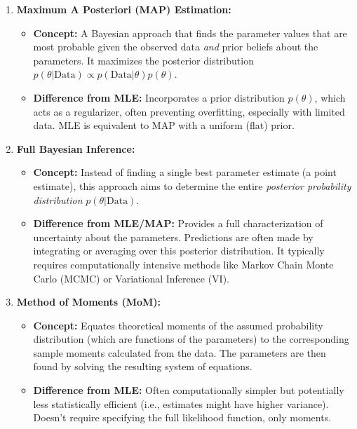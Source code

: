 \documentclass{article}
\begin{document}
\begin{enumerate}

    \item \textbf{Maximum A Posteriori (MAP) Estimation:}
        \begin{itemize}[label=\textbullet, leftmargin=*]
            \item \textbf{Concept:} A Bayesian approach that finds the parameter values that are most probable given the observed data \emph{and} prior beliefs about the parameters. It maximizes the posterior distribution $p(\theta | \text{Data}) \propto p(\text{Data} | \theta) p(\theta)$.
            \item \textbf{Difference from MLE:} Incorporates a prior distribution $p(\theta)$, which acts as a regularizer, often preventing overfitting, especially with limited data. MLE is equivalent to MAP with a uniform (flat) prior.
        \end{itemize}

    \item \textbf{Full Bayesian Inference:}
        \begin{itemize}[label=\textbullet, leftmargin=*]
            \item \textbf{Concept:} Instead of finding a single best parameter estimate (a point estimate), this approach aims to determine the entire \emph{posterior probability distribution} $p(\theta | \text{Data})$.
            \item \textbf{Difference from MLE/MAP:} Provides a full characterization of uncertainty about the parameters. Predictions are often made by integrating or averaging over this posterior distribution. It typically requires computationally intensive methods like Markov Chain Monte Carlo (MCMC) or Variational Inference (VI).
        \end{itemize}

    \item \textbf{Method of Moments (MoM):}
        \begin{itemize}[label=\textbullet, leftmargin=*]
            \item \textbf{Concept:} Equates theoretical moments of the assumed probability distribution (which are functions of the parameters) to the corresponding sample moments calculated from the data. The parameters are then found by solving the resulting system of equations.
            \item \textbf{Difference from MLE:} Often computationally simpler but potentially less statistically efficient (i.e., estimates might have higher variance). Doesn't require specifying the full likelihood function, only moments.
        \end{itemize}


\end{enumerate}
\end{document}
